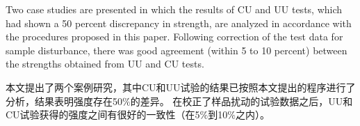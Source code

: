\documentclass{bilidoc}
\begin{document}
\begin{paracol}{2}
    \switchcolumn*

    Two case studies are presented in which the results of CU and UU tests, which had shown a 50 percent discrepancy in strength, are analyzed in accordance with the procedures proposed in this paper. Following correction of the test data for sample disturbance, there was good agreement (within 5 to 10 percent) between the strengths obtained from UU and CU tests.

    \switchcolumn
        
    本文提出了两个案例研究，其中CU和UU试验的结果已按照本文提出的程序进行了分析，结果表明强度存在50$\%$的差异。 在校正了样品扰动的试验数据之后，UU和CU试验获得的强度之间有很好的一致性（在5$\%$到10$\%$之内）。

\end{paracol}
\vspace{10pt}













\end{document}
